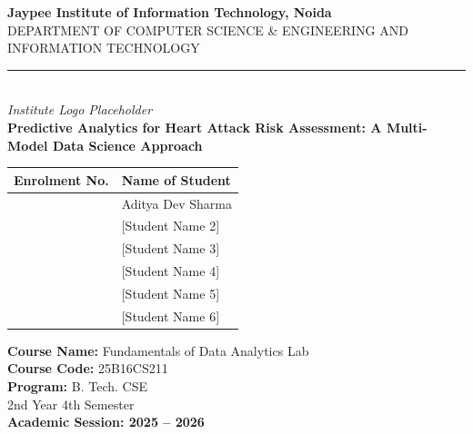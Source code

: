 \documentclass[12pt]{article}
\begin{document}
\begin{titlepage}
    \centering
    {\Large \textbf{Jaypee Institute of Information Technology, Noida}} \\[0.5cm]
    {\large DEPARTMENT OF COMPUTER SCIENCE \& ENGINEERING AND INFORMATION TECHNOLOGY} \\[1cm]
    
    \rule{4cm}{4cm} \\[0.5cm]
    \textit{Institute Logo Placeholder} \\[1cm]
    
    {\huge \textbf{Predictive Analytics for Heart Attack Risk Assessment: A Multi-Model Data Science Approach}} \\[1.5cm]
    
    \begin{table}[H]
        \centering
        \begin{tabular}{ll}
            \toprule
            \textbf{Enrolment No.} & \textbf{Name of Student} \\
            \midrule
            [Enrol No 1] & Aditya Dev Sharma \\
            [Enrol No 2] & [Student Name 2] \\
            [Enrol No 3] & [Student Name 3] \\
            [Enrol No 4] & [Student Name 4] \\
            [Enrol No 5] & [Student Name 5] \\
            [Enrol No 6] & [Student Name 6] \\
            \bottomrule
        \end{tabular}
    \end{table}
    
    \vfill
    
    {\large \textbf{Course Name:} Fundamentals of Data Analytics Lab} \\
    {\large \textbf{Course Code:} 25B16CS211} \\
    {\large \textbf{Program:} B. Tech. CSE} \\
    {\large 2nd Year 4th Semester} \\[1cm]
    
    {\large \textbf{Academic Session: 2025 – 2026}}
\end{titlepage}

\newpage
\end{document}
